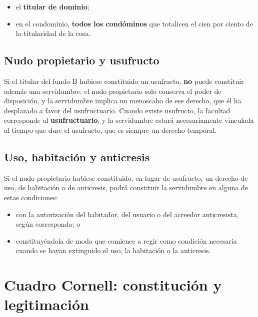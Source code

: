 \documentclass[12pt,oneside]{book}
\begin{document}
\begin{itemize}
    \item el \textbf{titular de dominio};
    \item en el condominio, \textbf{todos los condóminos} que totalicen el cien por ciento de la titularidad de la cosa.
\end{itemize}

\subsection{Nudo propietario y usufructo}

Si el titular del fundo B hubiese constituido un usufructo, \textbf{no} puede constituir además una servidumbre: el nudo propietario solo conserva el poder de disposición, y la servidumbre implica un menoscabo de ese derecho, que él ha desplazado a favor del usufructuario. Cuando existe usufructo, la facultad corresponde al \textbf{usufructuario}, y la servidumbre estará necesariamente vinculada al tiempo que dure el usufructo, que es siempre un derecho temporal.

\subsection{Uso, habitación y anticresis}

Si el nudo propietario hubiese constituido, en lugar de usufructo, un derecho de uso, de habitación o de anticresis, podrá constituir la servidumbre en alguna de estas condiciones:

\begin{itemize}
    \item con la autorización del habitador, del usuario o del acreedor anticresista, según corresponda; o
    \item constituyéndola de modo que comience a regir como condición necesaria cuando se hayan extinguido el uso, la habitación o la anticresis.
\end{itemize}

\section*{Cuadro Cornell: constitución y legitimación}
\end{document}
